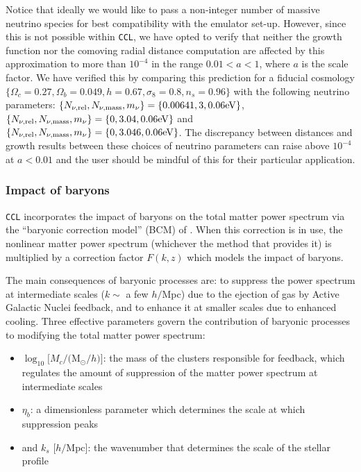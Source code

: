 \documentclass[\docopts]{\docclass}
\newcommand{\ccl}{{\tt CCL}\xspace}
\begin{document}
Notice that ideally we would like to pass a non-integer number of massive
neutrino species for best compatibility with the emulator set-up. However,
since this is not possible within {\tt CCL}, we have opted to verify that neither
the growth function nor the comoving radial distance computation are affected by
this approximation to more than $10^{-4}$ in the range $0.01<a<1$, where $a$ is
the scale factor. We have verified this by comparing this prediction for a
fiducial cosmology $\{\Omega_c=0.27,\Omega_b=0.049,h=0.67,\sigma_8=0.8,n_s=0.96\}$
with the following neutrino parameters:
$\{N_{\nu,{\rm rel}},N_{\nu,{\rm mass}},m_{\nu}\}=\{0.00641,3,0.06{\rm eV}\}$, $\{N_{\nu,{\rm rel}},N_{\nu,{\rm mass}},m_{\nu}\}=\{0,3.04,0.06{\rm eV}\}$ and
$\{N_{\nu,{\rm rel}},N_{\nu,{\rm mass}},m_{\nu}\}=\{0,3.046,0.06{\rm eV}\}$. The
discrepancy between distances and growth results between these choices of
neutrino parameters can raise above $10^{-4}$ at $a<0.01$ and the user should
be mindful of this for their particular application.

\subsubsection{Impact of baryons}
\label{ss:baryons}

\ccl incorporates the impact of baryons on the total matter power spectrum via
the ``baryonic correction model'' (BCM) of \citet{Schneider15}. When this
correction is in use, the nonlinear matter power spectrum (whichever the
method that provides it) is multiplied by a correction factor $F(k,z)$ which
models the impact of baryons.

The main consequences of baryonic processes are: to suppress the power spectrum
at intermediate scales ($k\sim$ a few $h/$Mpc) due to the ejection of gas by
Active Galactic Nuclei feedback, and to enhance it at smaller scales due to
enhanced cooling. Three effective parameters govern the contribution of baryonic
processes to modifying the total matter power spectrum:

\begin{itemize}
  \item $\log_{10} [M_c/($M$_\odot/h)]$: the mass of the clusters responsible for
    feedback, which regulates the amount of suppression of the matter power spectrum at intermediate scales
  \item $\eta_b$: a dimensionless parameter which determines the scale at which suppression peaks
  \item and $k_s$ [$h/$Mpc]: the wavenumber that determines the scale of the stellar profile
\end{itemize}
\end{document}
